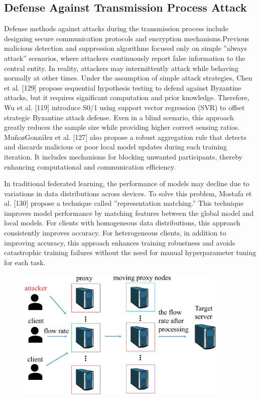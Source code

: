 \subsection{Defense Against Transmission Process Attack}  
Defense methods against attacks during the transmission
process include designing secure communication
protocols and encryption mechanisms.Previous malicious detection and suppression
algorithms focused only on simple ”always attack” scenarios,
where attackers continuously report false information to
the central entity. In reality, attackers may intermittently
attack while behaving normally at other times. Under the
assumption of simple attack strategies, Chen et al. [129]
propose sequential hypothesis testing to defend against
Byzantine attacks, but it requires significant
computation and prior knowledge. Therefore, Wu et al. [119]
introduce S0/1 using support vector regression (SVR)
to offset strategic Byzantine attack defense. Even in a
blind scenario, this approach greatly reduces the sample
size while providing higher correct sensing ratios.
MuñozGonzález et al. [127] also propose a robust aggregation
rule that detects and discards malicious or poor local
model updates during each training iteration. It includes
mechanisms for blocking unwanted participants, thereby
enhancing computational and communication eﬀiciency.  

In traditional federated learning, the performance of
models may decline due to variations in data distributions
across devices. To solve this problem, Mostafa et al. [130]
propose a technique called ”representation matching.”
This technique improves model performance by matching
features between the global model and local models. For
clients with homogeneous data distributions, this approach
consistently improves accuracy. For heterogeneous clients,
in addition to improving accuracy, this approach enhances
training robustness and avoids catastrophic training
failures without the need for manual hyperparameter tuning
for each task.  

\begin{figure}[h]
    \centering
    \includegraphics[width=1.0\linewidth,height=2.5in]{output/fig18.eps}
     \caption{}
     \label{fig18}
\end{figure}


